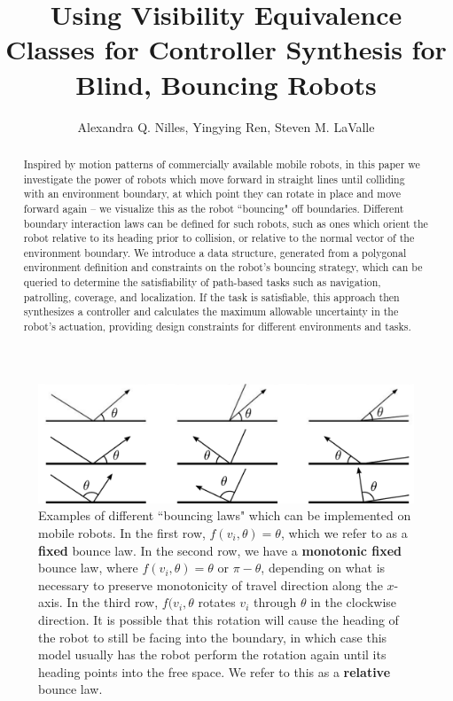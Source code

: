\documentclass[]{styles/svproc}  %
\title{Using Visibility Equivalence Classes for Controller Synthesis for Blind,
Bouncing Robots}
\author{Alexandra Q. Nilles, Yingying Ren, Steven M. LaValle%
}
\begin{document}
\maketitle

\begin{abstract}
Inspired by motion patterns of commercially available mobile robots, in this
paper we investigate the power of robots which move forward in straight lines
until colliding with an environment boundary, at which point they can rotate in
place and move forward again -- we visualize this as the robot ``bouncing" off
boundaries. Different boundary interaction laws can be
defined for such robots, such as ones which orient the robot relative to its
heading prior to collision, or relative to the normal vector of the environment
boundary. We introduce a data structure, generated from a polygonal environment
 definition and constraints on the robot's bouncing strategy, which can be
queried to determine the satisfiability of path-based tasks such as navigation,
patrolling, coverage, and localization. If the task is satisfiable, this
approach then synthesizes a controller and calculates the maximum allowable 
uncertainty in the robot's actuation, providing design constraints for different 
environments and tasks.
\end{abstract}

\begin{figure}
    \includegraphics[width=0.8\linewidth]{figures/bounce_examples.pdf}
    \centering
    \caption[test]{\label{fig:bex}Examples of different ``bouncing laws" which can be implemented on
mobile robots. In the first row, $f(v_i, \theta) = \theta$, which we refer to
as a \textbf{fixed} bounce law. In the second row, we have a \textbf{monotonic
fixed} bounce law, where
$f(v_i, \theta) = \theta$ or $\pi-\theta$, depending on what is necessary to
preserve monotonicity of travel direction along the $x$-axis. In the third
row, $f(v_i, \theta$ rotates $v_i$ through $\theta$ in the clockwise
direction. It is possible that this rotation will cause the 
heading of the robot to still be facing into the boundary, in which case this model usually has the robot 
perform the rotation again until its heading points into the free space. We
refer to this as a \textbf{relative} bounce law.
}
\end{figure}
\end{document}
